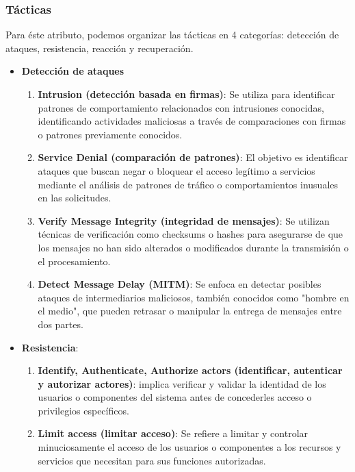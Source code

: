 \documentclass{article}
\begin{document}
		\subsubsection{Tácticas}
		Para éste atributo, podemos organizar las tácticas en 4 categorías: detección de ataques, resistencia, reacción y recuperación.
		\begin{itemize}		
			\item \textbf{Detección de ataques}
			\begin{enumerate}
				\item \textbf{Intrusion (detección basada en firmas)}: Se utiliza para identificar patrones de comportamiento relacionados con intrusiones conocidas, identificando actividades maliciosas a través de comparaciones con firmas o patrones previamente conocidos.
				
				\item \textbf{Service Denial (comparación de patrones)}: El objetivo es identificar ataques que buscan negar o bloquear el acceso legítimo a servicios mediante el análisis de patrones de tráfico o comportamientos inusuales en las solicitudes.
				
				\item \textbf{Verify Message Integrity (integridad de mensajes)}: Se utilizan técnicas de verificación como checksums o hashes para asegurarse de que los mensajes no han sido alterados o modificados durante la transmisión o el procesamiento.
				
				\item \textbf{Detect Message Delay (MITM)}: Se enfoca en detectar posibles ataques de intermediarios maliciosos, también conocidos como "hombre en el medio", que pueden retrasar o manipular la entrega de mensajes entre dos partes.
			\end{enumerate}
			
			\item \textbf{Resistencia}:
			\begin{enumerate}
				\item \textbf{Identify, Authenticate, Authorize actors (identificar, autenticar y autorizar actores)}: implica verificar y validar la identidad de los usuarios o componentes del sistema antes de concederles acceso o privilegios específicos.
				
				\item \textbf{Limit access (limitar acceso)}: Se refiere a limitar y controlar minuciosamente el acceso de los usuarios o componentes a los recursos y servicios que necesitan para sus funciones autorizadas.
				

\end{enumerate}
\end{itemize}
\end{document}
